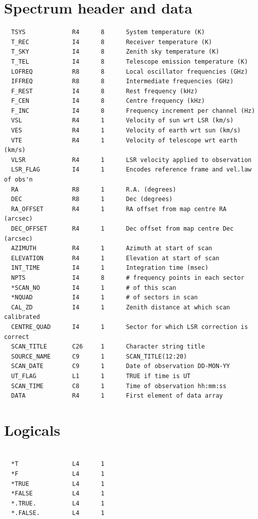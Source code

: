 \documentclass[11pt,twoside]{report}
\begin{document}
\section{Spectrum header and data}
\begin{verbatim}
  TSYS             R4      8      System temperature (K)
  T_REC            I4      8      Receiver temperature (K)
  T_SKY            I4      8      Zenith sky temperature (K)
  T_TEL            I4      8      Telescope emission temperature (K)
  LOFREQ           R8      8      Local oscillator frequencies (GHz)
  IFFREQ           R8      8      Intermediate frequencies (GHz)
  F_REST           I4      8      Rest frequency (kHz)
  F_CEN            I4      8      Centre frequency (kHz)
  F_INC            I4      8      Frequency increment per channel (Hz)
  VSL              R4      1      Velocity of sun wrt LSR (km/s)
  VES              R4      1      Velocity of earth wrt sun (km/s)
  VTE              R4      1      Velocity of telescope wrt earth (km/s)
  VLSR             R4      1      LSR velocity applied to observation
  LSR_FLAG         I4      1      Encodes reference frame and vel.law of obs'n
  RA               R8      1      R.A. (degrees)
  DEC              R8      1      Dec (degrees)
  RA_OFFSET        R4      1      RA offset from map centre RA (arcsec)
  DEC_OFFSET       R4      1      Dec offset from map centre Dec (arcsec)
  AZIMUTH          R4      1      Azimuth at start of scan
  ELEVATION        R4      1      Elevation at start of scan
  INT_TIME         I4      1      Integration time (msec)
  NPTS             I4      8      # frequency points in each sector
  *SCAN_NO         I4      1      # of this scan
  *NQUAD           I4      1      # of sectors in scan
  CAL_ZD           I4      1      Zenith distance at which scan calibrated
  CENTRE_QUAD      I4      1      Sector for which LSR correction is correct
  SCAN_TITLE       C26     1      Character string title
  SOURCE_NAME      C9      1      SCAN_TITLE(12:20)
  SCAN_DATE        C9      1      Date of observation DD-MON-YY
  UT_FLAG          L1      1      TRUE if time is UT
  SCAN_TIME        C8      1      Time of observation hh:mm:ss
  DATA             R4      1      First element of data array
\end{verbatim}
\section{Logicals}
\begin{verbatim}

  *T               L4      1
  *F               L4      1
  *TRUE            L4      1
  *FALSE           L4      1
  *.TRUE.          L4      1
  *.FALSE.         L4      1

\end{verbatim}
\end{document}
